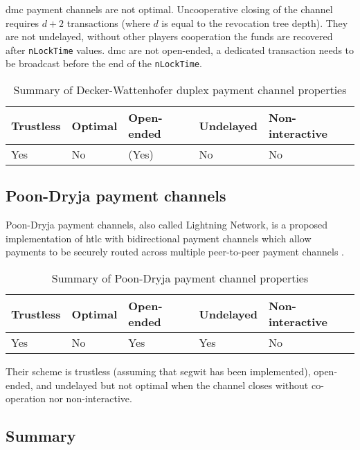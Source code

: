\documentclass{llncs}
\begin{document}
\gls{dmc} payment channels are not optimal. Uncooperative closing of the channel requires $d + 2$ transactions (where $d$ is equal to the revocation tree depth).  They are not undelayed, without other players cooperation the funds are recovered after \texttt{nLockTime} values. \gls{dmc} are not open-ended, a dedicated transaction needs to be broadcast before the end of the \texttt{nLockTime}.

\begin{table}[h]
  \begin{tabularx}{\textwidth}{ | X | l | l | l | X |}
  \hline
  Trustless & Optimal & Open-ended & Undelayed & Non-interactive \\
  \hline \hline
  Yes & No & (Yes) & No & No \\
  \hline
  \end{tabularx}
  \caption{Summary of Decker-Wattenhofer duplex payment channel properties}
  \label{fig:summaryDeckerWattenhoferPaymentChannel}
\end{table}

\subsection{Poon-Dryja payment channels}

Poon-Dryja payment channels, also called Lightning Network, is a proposed implementation of \gls{htlc} with bidirectional payment channels which allow payments to be securely routed across multiple peer-to-peer payment channels \cite{poon2016bitcoin}.

\begin{table}[h]
  \begin{tabularx}{\textwidth}{ | X | l | l | l | X |}
  \hline
  Trustless & Optimal & Open-ended & Undelayed & Non-interactive \\
  \hline \hline
  Yes & No & Yes & Yes & No \\
  \hline
  \end{tabularx}
  \caption{Summary of Poon-Dryja payment channel properties}
  \label{fig:summaryPoonDryjaPaymentChannel}
\end{table}

Their scheme is trustless (assuming that \gls{segwit} has been implemented), open-ended, and undelayed but not optimal when the channel closes without co-operation nor non-interactive.

\subsection{Summary}
\end{document}
